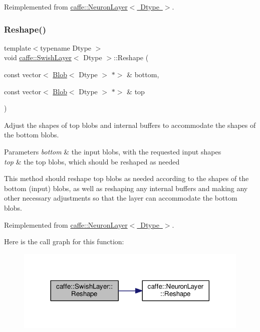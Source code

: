 Reimplemented from \mbox{\hyperlink{classcaffe_1_1_neuron_layer_a6d0facf4a5e6f459cf1cb8b28d945790}{caffe\+::\+Neuron\+Layer$<$ Dtype $>$}}.

\mbox{\label{classcaffe_1_1_swish_layer_a995afbac7e3adc0bfe157b0458656a9e}} 
\subsubsection{\texorpdfstring{Reshape()}{Reshape()}\hspace{0.1cm}{\footnotesize\ttfamily [2/2]}}
{\footnotesize\ttfamily template$<$typename Dtype $>$ \\
void \mbox{\hyperlink{classcaffe_1_1_swish_layer}{caffe\+::\+Swish\+Layer}}$<$ Dtype $>$\+::Reshape (\begin{DoxyParamCaption}\item[{const vector$<$ \mbox{\hyperlink{classcaffe_1_1_blob}{Blob}}$<$ Dtype $>$ $\ast$$>$ \&}]{bottom,  }\item[{const vector$<$ \mbox{\hyperlink{classcaffe_1_1_blob}{Blob}}$<$ Dtype $>$ $\ast$$>$ \&}]{top }\end{DoxyParamCaption})\hspace{0.3cm}{\ttfamily [virtual]}}



Adjust the shapes of top blobs and internal buffers to accommodate the shapes of the bottom blobs. 


\begin{DoxyParams}{Parameters}
{\em bottom} & the input blobs, with the requested input shapes \\
\hline
{\em top} & the top blobs, which should be reshaped as needed\\
\hline
\end{DoxyParams}
This method should reshape top blobs as needed according to the shapes of the bottom (input) blobs, as well as reshaping any internal buffers and making any other necessary adjustments so that the layer can accommodate the bottom blobs. 

Reimplemented from \mbox{\hyperlink{classcaffe_1_1_neuron_layer_a6d0facf4a5e6f459cf1cb8b28d945790}{caffe\+::\+Neuron\+Layer$<$ Dtype $>$}}.

Here is the call graph for this function\+:
\nopagebreak
\begin{figure}[H]
\begin{center}
\leavevmode
\includegraphics[width=317pt]{classcaffe_1_1_swish_layer_a995afbac7e3adc0bfe157b0458656a9e_cgraph}
\end{center}
\end{figure}


